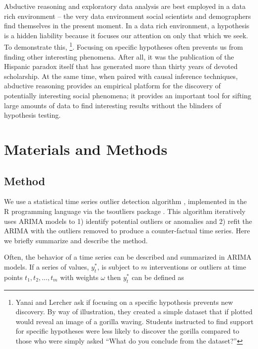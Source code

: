 \documentclass[12pt]{article}
\begin{document}
Abductive reasoning and exploratory data analysis are best employed in a
data rich environment -- the very data environment social scientists and
demographers find themselves in the present moment. In a data rich
environment, a hypothesis is a hidden liability
\citep{yanai_hypothesis_2020} because it focuses our attention on only
that which we seek. To demonstrate this, \footnote{Yanai and Lercher
  \citeyearpar{yanai_hypothesis_2020} ask if focusing on a specific
  hypothesis prevents new discovery. By way of illustration, they
  created a simple dataset that if plotted would reveal an image of a
  gorilla waving. Students instructed to find support for specific
  hypotheses were less likely to discover the gorilla compared to those
  who were simply asked ``What do you conclude from the dataset?''}.
Focusing on specific hypotheses often prevents us from finding other
interesting phenomena. After all, it was the publication of the Hispanic
paradox itself that has generated more than thirty years of devoted
scholarship. At the same time, when paired with causal inference
techniques, abductive reasoning provides an empirical platform for the
discovery of potentially interesting social phenomena; it provides an
important tool for sifting large amounts of data to find interesting
results without the blinders of hypothesis testing.

\hypertarget{materials-and-methods}{%
\section{Materials and Methods}\label{materials-and-methods}}

\hypertarget{method}{%
\subsection{Method}\label{method}}

We use a statistical time series outlier detection algorithm
\citep{chen1993joint}, implemented in the R programming language
\citep{rcore} via the tsoutliers package \citep{tsoutliers2019}. This
algorithm iteratively uses ARIMA models to 1) identify potential
outliers or anomalies and 2) refit the ARIMA with the outliers removed
to produce a counter-factual time series. Here we briefly summarize and
describe the method.

Often, the behavior of a time series can be described and summarized in
ARIMA models. If a series of values, \(y_t^*\), is subject to \(m\)
interventions or outliers at time points \(t_1,t_2,…,t_m\) with weights
\(\omega\) then \(y_t^*\) can be defined as
\end{document}
